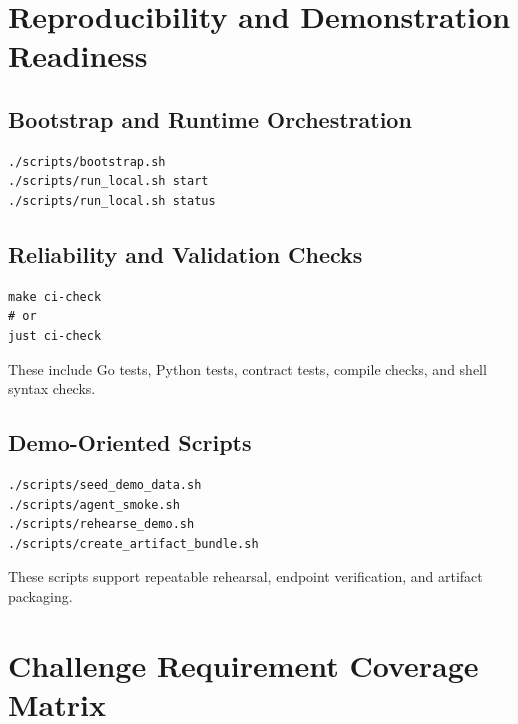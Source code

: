 \documentclass[11pt,a4paper]{article}
\begin{document}
\section{Reproducibility and Demonstration Readiness}

\subsection{Bootstrap and Runtime Orchestration}
\begin{lstlisting}[style=bashstyle]
./scripts/bootstrap.sh
./scripts/run_local.sh start
./scripts/run_local.sh status
\end{lstlisting}

\subsection{Reliability and Validation Checks}
\begin{lstlisting}[style=bashstyle]
make ci-check
# or
just ci-check
\end{lstlisting}

These include Go tests, Python tests, contract tests, compile checks, and shell syntax checks.

\subsection{Demo-Oriented Scripts}
\begin{lstlisting}[style=bashstyle]
./scripts/seed_demo_data.sh
./scripts/agent_smoke.sh
./scripts/rehearse_demo.sh
./scripts/create_artifact_bundle.sh
\end{lstlisting}

These scripts support repeatable rehearsal, endpoint verification, and artifact packaging.

\section{Challenge Requirement Coverage Matrix}
\end{document}
